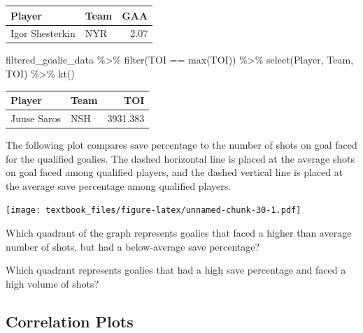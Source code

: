\documentclass[
  11pt,
]{book}
\newenvironment{Shaded}{\begin{snugshade}}{\end{snugshade}}
\newcommand{\FunctionTok}[1]{\textcolor[rgb]{0.00,0.00,0.00}{#1}}
\newcommand{\NormalTok}[1]{#1}
\newcommand{\SpecialCharTok}[1]{\textcolor[rgb]{0.00,0.00,0.00}{#1}}
\theoremstyle{definition}
\theoremstyle{definition}
\theoremstyle{definition}
\theoremstyle{definition}
\theoremstyle{remark}
\begin{document}
\begin{table}[H]
\centering
\begin{tabular}{llr}
\toprule
Player & Team & GAA\\
\midrule
Igor Shesterkin & NYR & 2.07\\
\bottomrule
\end{tabular}
\end{table}

\begin{Shaded}
\begin{Highlighting}[]
\NormalTok{filtered\_goalie\_data }\SpecialCharTok{\%\textgreater{}\%} \FunctionTok{filter}\NormalTok{(TOI }\SpecialCharTok{==} \FunctionTok{max}\NormalTok{(TOI)) }\SpecialCharTok{\%\textgreater{}\%} \FunctionTok{select}\NormalTok{(Player, Team, TOI) }\SpecialCharTok{\%\textgreater{}\%} \FunctionTok{kt}\NormalTok{()}
\end{Highlighting}
\end{Shaded}

\begin{table}[H]
\centering
\begin{tabular}{llr}
\toprule
Player & Team & TOI\\
\midrule
Juuse Saros & NSH & 3931.383\\
\bottomrule
\end{tabular}
\end{table}

The following plot compares save percentage to the number of shots on goal faced for the qualified goalies. The dashed horizontal line is placed at the average shots on goal faced among qualified players, and the dashed vertical line is placed at the average save percentage among qualified players.

\texttt{[image: textbook\_files/figure-latex/unnamed-chunk-30-1.pdf]}

Which quadrant of the graph represents goalies that faced a higher than average number of shots, but had a below-average save percentage?

\hfill\break
\hfill\break
\hfill\break

Which quadrant represents goalies that had a high save percentage and faced a high volume of shots?

\hfill\break
\hfill\break
\hfill\break

\hypertarget{correlation-plots}{%
\subsection{Correlation Plots}\label{correlation-plots}}
\end{document}
